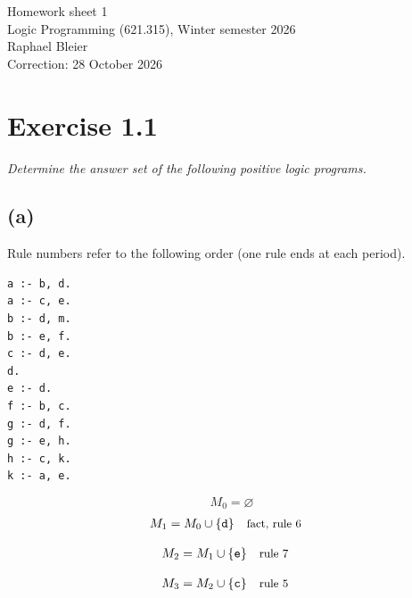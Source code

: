 \documentclass[a4paper,11pt]{article}
\newif\ifexplain
\newcommand{\explain}[1]{\ifexplain\begin{erklbox}#1\end{erklbox}\fi}
\newcommand{\why}[1]{\text{\small #1}}
\newcommand{\angabe}[1]{\textit{#1}\par}
\newcommand{\aufgabe}[1]{\section*{Exercise #1}}
\newcommand{\teil}[1]{\subsection*{(#1)}}
\newcommand{\at}[1]{\texttt{#1}}
\begin{document}
\begin{center}{\Large Homework sheet 1}\\Logic Programming (621.315), Winter semester 2026\\Raphael Bleier\\Correction: 28 October 2026\end{center}
\explain{Ein Atom ist hier eine einzelne Aussage, etwa $\at{bird(tweety)}$. Ein Modell erfüllt alle Regeln, muss aber nicht die kleinste begründbare Menge sein. Ein Answer Set ist die kleinste abgeschlossene Menge seines eigenen Redukts. Default-Negation \texttt{not a} prüft, ob $a$ im Kandidaten fehlt; sie ist keine zusätzliche Aussage $\neg a$. Wir verwenden die Begriffe und die Notation $\operatorname{Cn}(P)$ aus den Kursnotizen zu positiven und normalen Programmen.}
\aufgabe{1.1}
\angabe{Determine the answer set of the following positive logic programs.}
\teil{a}
Rule numbers refer to the following order (one rule ends at each period).
\begin{small}
\begin{verbatim}
a :- b, d.
a :- c, e.
b :- d, m.
b :- e, f.
c :- d, e.
d.
e :- d.
f :- b, c.
g :- d, f.
g :- e, h.
h :- c, k.
k :- a, e.
\end{verbatim}
\end{small}
\explain{Das Programm enthält keine Default-Negation. Wir beginnen bei der leeren Menge und wenden nur Regeln an, deren Körper bereits erfüllt ist. Fakten starten die Herleitung. Eine positive Schleife ohne diesen Start liefert dagegen keine Atome.}
\[
M_0=\varnothing
\]
\begin{align*}
M_{1} &= M_{0}\cup \{\at{d}\} && \why{fact, rule 6}
\end{align*}
\explain{Diese Regel hat keinen Körper. Ihr Kopf $\at{d}$ ist damit ein Fakt und muss in die Menge.}
\begin{align*}
M_{2} &= M_{1}\cup \{\at{e}\} && \why{rule 7}
\end{align*}
\explain{Für $\at{e}$ brauchen wir $\at{d}$. Weil diese Voraussetzungen bereits hergeleitet sind, dürfen wir den Regelkopf jetzt aufnehmen und alle bisherigen Atome behalten; bei einer fehlenden Voraussetzung würde diese Regel dagegen noch nichts beitragen.}
\begin{align*}
M_{3} &= M_{2}\cup \{\at{c}\} && \why{rule 5}
\end{align*}
\explain{Für $\at{c}$ brauchen wir $\at{d}$ und $\at{e}$. Weil diese Voraussetzungen bereits hergeleitet sind, dürfen wir den Regelkopf jetzt aufnehmen und alle bisherigen Atome behalten; bei einer fehlenden Voraussetzung würde diese Regel dagegen noch nichts beitragen.}
\end{document}
